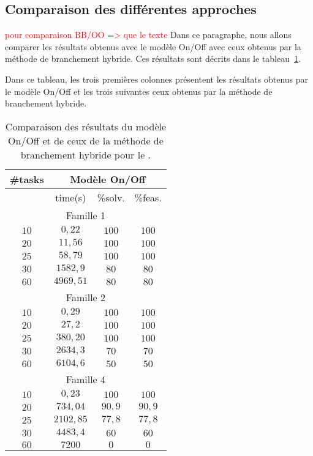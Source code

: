 \subsection{Comparaison des différentes approches}

\textcolor{red}{\LARGE pour comparaison BB/OO => que le texte}
Dans ce paragraphe, nous allons comparer les résultats obtenus avec le
modèle On/Off avec ceux obtenus par la méthode de branchement
hybride. Ces résultats sont décrits dans le
tableau~\ref{tab:comp_OOBB}.

Dans ce tableau, les trois premières colonnes présentent les résultats
obtenus par le modèle On/Off et les trois suivantes ceux obtenus par
la méthode de branchement hybride.   
\begin{table}[!htb]
  \begin{center}
    \begin{tabular}{|c|ccc|}
      \hline
      \#tasks & \multicolumn{3}{c|}{Modèle On/Off}\\ 
      \hline 
              & time(s) &\%solv. &\%feas. \\ 
      \hline
      \multicolumn{4}{|c|}{Famille 1}\\
      \hline 
      $10 $& $0,22$ & $100$ & $100 $ \\ 
      $20 $& $11,56$ & $100$ & $100 $ \\ 
      $25 $& $58,79$ & $100$ & $100 $ \\ 
      $30 $& $1582,9$ & $80$ & $80 $ \\ 
      $60 $& $4969,51$ & $80$ & $80 $ \\ 
      \hline 
      \multicolumn{4}{|c|}{Famille 2}\\
      \hline 
      $10 $& $0,29$ & $100$ & $100 $ \\ 
      $20 $& $27,2$ & $100$ & $100 $ \\ 
      $25 $& $380,20$ & $100$ & $100 $ \\ 
      $30 $& $2634,3$ & $70$ & $70 $ \\ 
      $60 $& $6104,6$ & $50$ & $50 $ \\ 
      \hline 
      \multicolumn{4}{|c|}{Famille 4}\\
      \hline 
$10$&$	0,23	$&$	100	$&$	100	$\\
$20$&$	734,04	$&$	90,9	$&$	90,9	$\\
$25$ &     $	2102,85	$&$	77,8	$&$	77,8	$\\ 
$30$   &   $	4483,4	$&$	60	$&$	60$\\
$60$ & $	7200	$&$	0	$&$	0$\\ 
      \hline 
    \end{tabular}
  \end{center}
  \caption{Comparaison des résultats du modèle On/Off et de ceux de la
    méthode de branchement hybride pour le \CECSP.}
  \label{tab:comp_OOBB}
\end{table}


